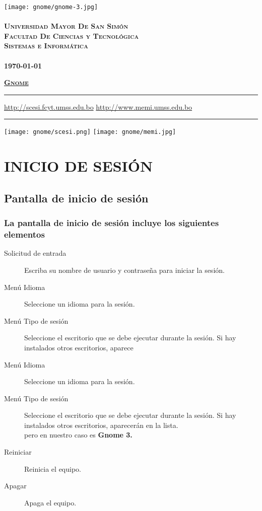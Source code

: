 \documentclass[12pt,letterpaper]{book}
\begin{document}
 \begin{titlepage}
	\thispagestyle{empty}
	\begin{center}
		\texttt{[image: gnome/gnome-3.jpg]} \\
		~\\
		\Large{\textsc{\bf Universidad Mayor De San Simón}}\\
		\large{\textsc{\bf Facultad De Ciencias y Tecnológica}}\\
		\large{\textsc{\bf Sistemas e Informática}}\\
		~\\
		\small{\bf \today}
	\end{center}
 	\vfill
	\begin{center}
		\Huge{\underline{\textsc{\bf Gnome}}}
	\end{center}
	\vfill
	\hrule
	\vspace{0.1cm}
	\noindent\small{\url{http://scesi.fcyt.umss.edu.bo} \hfill \url{http://www.memi.umss.edu.bo}}
	\hrule
	\vspace{0.1cm}
	\noindent\small{\hspace{1.35cm}\texttt{[image: gnome/scesi.png]} \hfill \texttt{[image: gnome/memi.jpg]}\hspace{0.43cm}}

\end{titlepage}

\tableofcontents
\part{INICIO DE SESIÓN}
\chapter{Pantalla de inicio de sesión}
\section{La pantalla de inicio de sesión incluye los siguientes elementos}
\begin{description}
\item[Solicitud de entrada] Escriba su nombre de usuario y contraseña para iniciar la sesión.
\item[Menú Idioma] Seleccione un idioma para la sesión.
\item [Menú Tipo de sesión] Seleccione el escritorio que se debe ejecutar durante la sesión. Si hay instalados otros escritorios, aparece
\item[Menú Idioma] Seleccione un idioma para la sesión.
\item [Menú Tipo de sesión] Seleccione el escritorio que se debe ejecutar durante la sesión. Si hay instalados otros escritorios, aparecerán en la lista.\\ pero en nuestro caso es {\bf Gnome 3.}
\item[Reiniciar] Reinicia el equipo.
\item[Apagar] Apaga el equipo.
\end{description}
\end{document}
